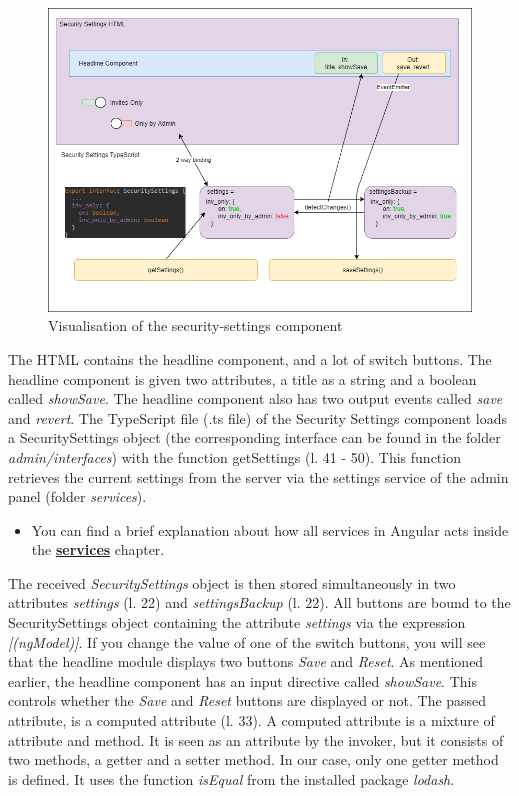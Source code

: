 \begin{figure}[H]
    \centering
    \includegraphics[width=1.0\textwidth]{./images/security_settings}
    \caption{Visualisation of the security-settings component}
    \label{fig:secset}
\end{figure}

The HTML contains the headline component, and a lot of switch buttons.
The headline component is given two attributes,
a title as a string and a boolean called \textit{showSave}.
The headline component also has two output events called \textit{save} and \textit{revert}.
The TypeScript file (.ts file) of the Security Settings component loads a SecuritySettings object (the corresponding
interface can be found in the folder \textit{admin/interfaces}) with the function getSettings (l. 41 - 50).
This function retrieves the current settings from the server via the settings service of the admin panel (folder
\textit{services}).

\begin{itemize}
    \item You can find a brief explanation about how all services in Angular acts inside the
        \hyperref[subsec:services]{\textbf{services}} chapter.
\end{itemize}

The received \textit{SecuritySettings} object is then stored simultaneously in two attributes \textit{settings}
(l. 22) and \textit{settingsBackup} (l. 22).
All buttons are bound to the SecuritySettings object containing the attribute \textit{settings} via the expression
\textit{[(ngModel)]}.
If you change the value of one of the switch buttons, you will see that the headline module displays two buttons
\textit{Save} and \textit{Reset}.
As mentioned earlier, the headline component has an input directive called \textit{showSave}.
This controls whether the \textit{Save} and \textit{Reset} buttons are displayed or not.
The passed attribute, is a computed attribute (l. 33).
A computed attribute is a mixture of attribute and method.
It is seen as an attribute by the invoker, but it consists of two methods, a getter and a setter method.
In our case, only one getter method is defined.
It uses the function \textit{isEqual} from the installed package \textit{lodash}.

